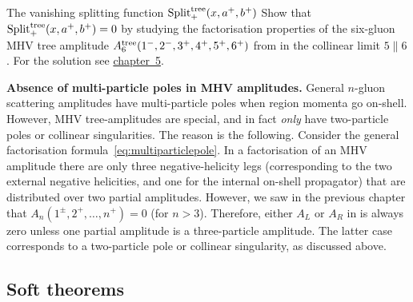 \newpage

\begin{exer}{The vanishing splitting function ${\rm Split}_{+}^{\rm tree}(x, a^{+},b^{+})$}
\label{Exer:2.1}
Show that ${\rm Split}_{+}^{\rm tree}(x, a^{+},b^{+}) = 0$ by studying the factorisation properties of the six-gluon MHV tree amplitude $A_{6}^{\rm tree}(1^{-}, 2^{-}, 3^{+}, 4^{+}, 5^{+}, 6^{+} )$ from  in the collinear limit $5 \parallel 6$. 
For the solution see \hyperref[Sol:2.1]{chapter~5}.
\end{exer}

\begin{svgraybox}{\bf Absence of multi-particle poles in MHV amplitudes.}
General $n$-gluon scattering amplitudes have multi-particle poles when region momenta 
go on-shell. However, MHV tree-amplitudes are special, and in fact \emph{only}
 have two-particle poles or collinear singularities. 
The reason is the following. 
Consider the general factorisation formula~\eqref{eq:multiparticlepole}.
In a factorisation of an MHV amplitude there
are only three negative-helicity legs (corresponding to the two external negative helicities, and one for the internal
on-shell propagator) that are distributed over two partial amplitudes. 
However, we saw in the previous chapter that  $A_{n}(1^{\pm},2^{+},\ldots, n^{+}) = 0$ (for $n > 3$).
Therefore, either $A_{L}$ or $A_{R}$ in  is always zero unless one 
partial amplitude is a three-particle amplitude. The latter case corresponds to a two-particle pole or collinear
singularity, as discussed above.
\end{svgraybox}

\subsection{Soft theorems}


